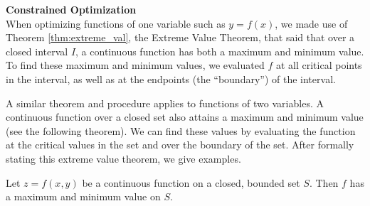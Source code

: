\noindent\textbf{\large Constrained Optimization}\\

When optimizing functions of one variable such as $y=f(x)$, we made use of Theorem \ref{thm:extreme_val}, the Extreme Value Theorem, that said that over a closed interval $I$, a continuous function has both a maximum and minimum value. To find these maximum and minimum values, we evaluated $f$ at all critical points in the interval, as well as at the endpoints (the ``boundary'') of the interval.

A similar theorem and procedure applies to functions of two variables. A continuous function over a closed set also attains a maximum and minimum value (see the following theorem). We can find these values by evaluating the function at the critical values in the set and over the boundary of the set. After formally stating this extreme value theorem, we give examples.

{Let $z=f(x,y)$ be a continuous function on a closed, bounded set $S$. Then $f$ has a maximum and minimum value on $S$.
}

